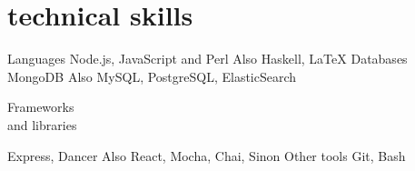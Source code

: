 \documentclass[a4paper]{friggeri-cv}
\begin{document}
\section{technical skills}

\begin{entrylist}
    \entry
        {Languages}
        {Node.js, JavaScript and Perl}
        {}
        {\small Also Haskell, \LaTeX}
        {\vspace{-0.5cm}}
    \entry
        {Databases}
        {MongoDB}
        {}
        {\small Also MySQL, PostgreSQL, ElasticSearch}
        {\vspace{-0.5cm}}
    \entry
    {\parbox[t][][t]{2.3cm}{Frameworks\\{\small and libraries}}}
        {Express, Dancer}
        {}
        {\small Also React, Mocha, Chai, Sinon}
        {\vspace{-0.4cm}}
    \entry
        {Other tools}
        {Git, Bash}
        {}
        {}
        {\vspace{-3.8cm}}
\end{entrylist}
\end{document}
